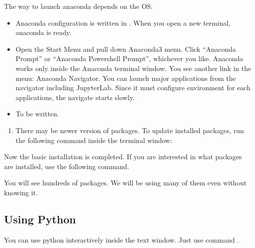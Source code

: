 \documentclass[letterpaper,10pt,english]{jupyterBook}
\begin{document}
\sphinxAtStartPar
The way to launch anaconda depends on the OS.
\begin{itemize}
\item {}
\sphinxAtStartPar
{}Anaconda configuration is written in .  When you open a new terminal, anaconda is ready.

\item {}
\sphinxAtStartPar
{}Open the Start Menu and pull down Anaconda3 menu. Click “Anaconda Prompt”  or “Anaconda Powershell Prompt”, whichever you like. Anaconda works only inside the Anaconda terminal window. You see another link in the menu: Anaconda Navigator.  You can launch major applications from the navigator including JupyterLab.  Since it must configure environment for each applications, the navigate starts slowly.

\item {}
\sphinxAtStartPar
{}To be written.

\end{itemize}
\begin{enumerate}
%
\item {}
\sphinxAtStartPar
{}There may be newer version of packages.  To update installed packages,  run the following command inside the terminal window:

\end{enumerate}

\begin{sphinxVerbatim}[commandchars=\\\{\}]
  
\end{sphinxVerbatim}

\sphinxAtStartPar
Now the basic installation is completed.  If you are interested in what packages are installed, use the following command.

\begin{sphinxVerbatim}[commandchars=\\\{\}]
 
\end{sphinxVerbatim}

\sphinxAtStartPar
You will see hundreds of packages.  We will be using many of them even without knowing it.


\subsection{Using Python}
\label{\detokenize{preparation/python:using-python}}
\sphinxAtStartPar
You can use python interactively inside the text window.  Just use command .
\end{document}
